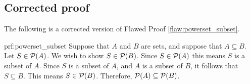\clearpage
\subsection{Corrected proof}

The following is a corrected version of Flawed Proof \ref{flaw:powerset_subset}. 

\begin{prf}{prf:powerset_subset} 
Suppose that $A$ and $B$ are sets, and suppose that $A \subseteq B$.
Let $S \in \mathcal P(A)$. We wish to show $S \in \mathcal P(B)$. Since $S \in \mathcal P(A)$ this means $S$ is a subset of $A$. Since $S$ is a subset of $A$, and $A$ is a subset of $B$, it follows that $S \subseteq B$. This means $S \in \mathcal P(B)$. Therefore, $\mathcal P(A) \subseteq \mathcal P(B)$. 
\end{prf}